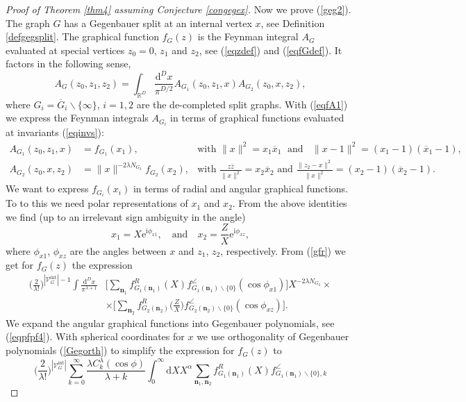 \documentclass[oneside]{amsart}
\newcommand{\RR}{{\mathbb R}}
\newcommand{\ee}{\mathrm{e}}
\newcommand{\ii}{\mathrm{i}}
\newcommand{\dd}{\mathrm{d}}
\newcommand{\xx}{{\overline{x}}}
\newcommand{\zz}{{\overline{z}}}
\newcommand{\Gg}{{\overline{G}}}
\newcommand{\sV}{\mathcal{V}}
\newcommand{\sVGint}{{\sV_G^\mathrm{int}}}
\newcommand{\VGint}{{|\sVGint|}}
\theoremstyle{plain}
\begin{document}
\begin{proof}[Proof of Theorem \ref{thm4} assuming Conjecture \ref{congegex}]
Now we prove (\ref{geg2}). The graph $G$ has a Gegenbauer split at an internal vertex $x$, see Definition \ref{defgegsplit}. The graphical function $f_G(z)$ is the
Feynman integral $A_G$ evaluated at special vertices $z_0=0$, $z_1$ and $z_2$, see (\ref{eqzdef}) and (\ref{eqfGdef}). It factors in the following sense,
\begin{equation}\label{gegfactor}
A_G(z_0,z_1,z_2)=\int_{\RR^D}\frac{\dd^Dx}{\pi^{D/2}}A_{G_1}(z_0,z_1,x)A_{G_2}(z_0,x,z_2),
\end{equation}
where $G_i=\Gg_i\backslash\{\infty\}$, $i=1,2$ are the de-completed split graphs.
With (\ref{eqfA1}) we express the Feynman integrals $A_{G_i}$ in terms of graphical functions evaluated at invariants (\ref{eqinvs}):
\begin{align*}
A_{G_1}(z_0,z_1,x)&=f_{G_1}(x_1),&\text{with $\|x\|^2=x_1\xx_1\;$ and $\;\;\|x-1\|^2=(x_1-1)(\xx_1-1)$},\\
A_{G_2}(z_0,x,z_2)&=\|x\|^{-2\lambda N_{G_2}}f_{G_2}(x_2),&\text{with $\frac{z\zz}{\|x\|^2}=x_2\xx_2$ and $\frac{\|z_2-x\|^2}{\|x\|^2}=(x_2-1)(\xx_2-1)$}.
\end{align*}
We want to express $f_{G_i}(x_i)$ in terms of radial and angular graphical functions. To to this we need polar representations of $x_1$ and $x_2$. From the above identities we find
(up to an irrelevant sign ambiguity in the angle)
$$
x_1=X\ee^{\ii\phi_{x1}},\quad\text{and}\quad x_2=\frac{Z}{X}\ee^{\ii\phi_{xz}},
$$
where $\phi_{x1}$, $\phi_{xz}$ are the angles between $x$ and $z_1$, $z_2$, respectively. From (\ref{gfr}) we get for $f_G(z)$ the expression
\begin{align*}
\Big(\frac{2}{\lambda!}\Big)^{\VGint-1}\!\!\!\int\frac{\dd^Dx}{\pi^{\lambda+1}} &\Big[\sum_{\mathbf n_1}f^R_{G_1(\mathbf n_1)}(X)f^\angle_{G_1(\mathbf n_1)\backslash\{0\}}(\cos\phi_{x1})\Big]
X^{-2\lambda N_{G_2}}
\times
\\
&\times
\Big[\sum_{\mathbf n_2}f^R_{G_2(\mathbf n_2)}\Big(\!\frac{Z}{X}\!\Big)f^\angle_{G_2(\mathbf n_2)\backslash\{0\}}(\cos\phi_{xz})\Big].
\end{align*}
We expand the angular graphical functions into Gegenbauer polynomials, see (\ref{eqpfpf4}).
With spherical coordinates for $x$ we use orthogonality of Gegenbauer polynomials (\ref{Gegorth}) to simplify the expression for $f_G(z)$ to
$$
\Big(\frac{2}{\lambda!}\Big)^\VGint\sum_{k=0}^\infty\frac{\lambda C^\lambda_k(\cos\phi)}{\lambda+k}
\int_0^\infty\dd X X^\alpha\sum_{\mathbf n_1,\mathbf n_2}f^R_{G_1(\mathbf n_1)}(X)f^\angle_{G_1(\mathbf n_1)\backslash\{0\},k}
$$
\end{proof}
\end{document}
